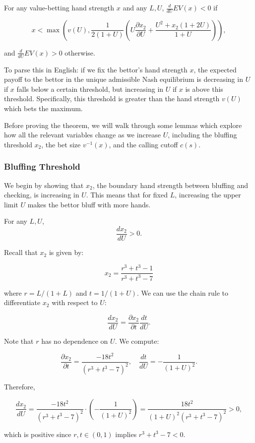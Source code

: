 \documentclass[../../main/main.tex]{subfiles}
\begin{document}
\begin{theorem}
    \label{thm:payoff_increasing}
    For any value-betting hand strength $x$ and any $L, U$, $\frac{d}{dU} EV(x) < 0$ if

    $$x < \max\left(v(U), \frac{1}{2(1+U)} \left( U \frac{\partial x_2}{\partial U} + \frac{U^2 + x_2(1 + 2U)}{1+U} \right) \right),$$

    and $\frac{d}{dU} EV(x) > 0$ otherwise.
\end{theorem}

To parse this in English: if we fix the bettor's hand strength $x$, the expected payoff to the bettor in the unique admissible Nash equilibrium is decreasing in $U$ if $x$ falls below a certain threshold, but increasing in $U$ if $x$ is above this threshold. Specifically, this threshold is greater than the hand strength $v(U)$ which bets the maximum.

Before proving the theorem, we will walk through some lemmas which explore how all the relevant variables change as we increase $U$, including the bluffing threshold $x_2$, the bet size $v^{-1}(x)$, and the calling cutoff $c(s)$.

\subsubsection{Bluffing Threshold}

We begin by showing that $x_2$, the boundary hand strength between bluffing and checking, is increasing in $U$. This means that for fixed $L$, increasing the upper limit $U$ makes the bettor bluff with more hands.

\begin{lemma}
    \label{lem:x2_increasing}
    For any $L, U$,
    $$ \frac{d x_2}{d U} > 0. $$
\end{lemma}

\begin{customproof}
    Recall that $x_2$ is given by:

    \[ x_2 = \frac{r^{3} + t^{3} - 1}{r^{3} + t^{3} - 7} \]

    where $r = L/(1+L)$ and $t = 1/(1+U)$. We can use the chain rule to differentiate $x_2$ with respect to $U$:

    \[ \frac{d x_2}{d U} = \frac{\partial x_2}{\partial t} \frac{d t}{d U}. \]

    Note that $r$ has no dependence on $U$. We compute:

    \[ \frac{\partial x_2}{\partial t} = \frac{-18 t^{2}}{\left(r^{3} + t^{3} - 7\right)^{2}}, \quad \frac{d t}{d U} = - \frac{1}{(1+U)^2}. \]

    Therefore,

    \[ \frac{d x_2}{d U} = \frac{-18 t^{2}}{\left(r^{3} + t^{3} - 7\right)^{2}} \cdot \left(- \frac{1}{(1+U)^2}\right) = \frac{18 t^{2}}{(1+U)^2\left(r^{3} + t^{3} - 7\right)^{2}} > 0, \]

    which is positive since $r, t \in (0, 1)$ implies $r^3 + t^3 - 7 < 0$.

\end{customproof}
\end{document}
